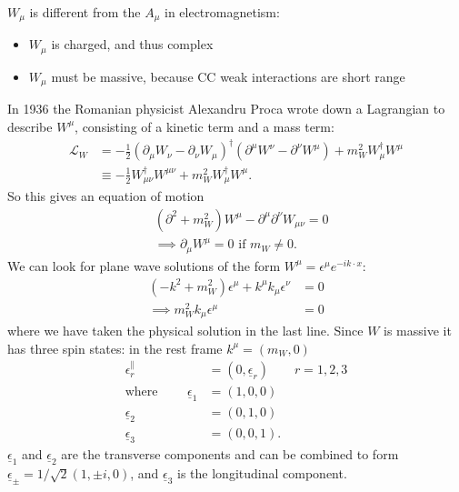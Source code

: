 \documentclass[a4paper,12pt]{article}
\begin{document}
$W_\mu$ is different from the $A_\mu$ in electromagnetism: 
\begin{itemize}
\item $W_\mu$ is charged, and thus complex
\item $W_\mu$ must be massive, because CC weak interactions are short range
\end{itemize}
In 1936 the Romanian physicist Alexandru Proca wrote down a Lagrangian to describe $W^\mu$, consisting of a kinetic term and a mass term:
\begin{equation}
\begin{split}
\mathcal{L}_W &= - \frac{1}{2}(\partial_\mu W_\nu - \partial_\nu W_\mu)^\dagger(\partial^\mu W^\nu - \partial^\nu W^\mu) + m_W^2 W_\mu^\dagger W^\mu \\
&\equiv -\frac{1}{2}W_{\mu \nu}^\dagger W^{\mu \nu} + m_W^2 W_\mu^\dagger W^\mu .
\end{split}
\end{equation}
So this gives an equation of motion
\begin{equation}
\begin{split}
&(\partial^2 + m_W^2) W^\mu - \partial^\mu \partial^\nu W_{\mu \nu} = 0 \\
&\implies \partial_\mu W^\mu =0 \text{ if } m_W \neq 0.
\end{split}
\end{equation}
We can look for plane wave solutions of the form $W^\mu = \epsilon^\mu e^{-i k \cdot x}$:
\begin{equation}
\begin{split}
(-k^2 + m_W^2)\epsilon^\mu + k^\mu k_\mu \epsilon^\nu &= 0 \\
\implies m_W^2 k_\mu \epsilon^\mu &= 0 
\end{split}
\end{equation}
where we have taken the physical solution in the last line. Since $W$ is massive it has three spin states: in the rest frame $k^\mu = (m_W, 0)$
\begin{equation}
\begin{split}
\epsilon_r^\parallel &= (0, \underline{\epsilon}_r) \qquad r=1,2,3 \\
\text{where } \qquad \underline{\epsilon}_1 &= (1,0,0) \\
\underline{\epsilon}_2 &= (0,1,0) \\
\underline{\epsilon}_3 &= (0,0,1). 
\end{split}
\end{equation}
$\underline{\epsilon}_1$ and $\underline{\epsilon}_2$ are the transverse components and can be combined to form $\underline{\epsilon}_\pm = 1/\sqrt{2}(1, \pm i, 0)$, and $\underline{\epsilon}_3$ is the longitudinal component. 
\end{document}
